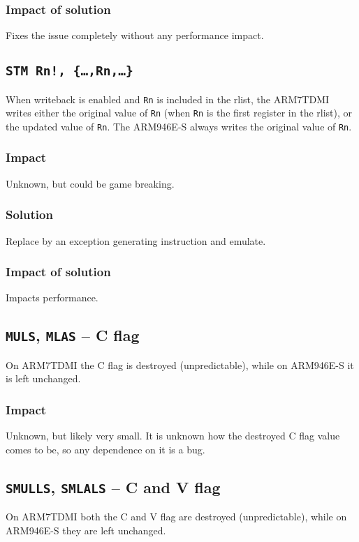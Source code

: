 \documentclass[a4paper,10pt]{report}
\begin{document}
		\subsubsection{Impact of solution}
		Fixes the issue completely without any performance impact.
		
	\subsection{\texttt{STM Rn!, \{\dots,Rn,\dots\}}}
		When writeback is enabled and \texttt{Rn} is included in the rlist, the ARM7TDMI writes either the original value of \texttt{Rn} (when \texttt{Rn} is the first register in the rlist), or the updated value of \texttt{Rn}. The ARM946E-S always writes the original value of \texttt{Rn}.
		
		\subsubsection{Impact}
		Unknown, but could be game breaking.
		
		\subsubsection{Solution}
		Replace by an exception generating instruction and emulate.
		
		\subsubsection{Impact of solution}
		Impacts performance.
		
	\subsection{\texttt{MULS}, \texttt{MLAS} \--- C flag}
		On ARM7TDMI the C flag is destroyed (unpredictable), while on ARM946E-S it is left unchanged.
		
		\subsubsection{Impact}
		Unknown, but likely very small. It is unknown how the destroyed C flag value comes to be, so any dependence on it is a bug.
	
	\subsection{\texttt{SMULLS}, \texttt{SMLALS} \--- C and V flag}
		On ARM7TDMI both the C and V flag are destroyed (unpredictable), while on ARM946E-S they are left unchanged.
		
\end{document}
